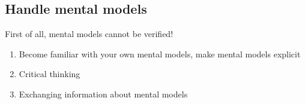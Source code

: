 \hypertarget{handle-mental-models}{%
\subsection{Handle mental models}\label{handle-mental-models}}

First of all, mental models cannot be verified!

\begin{enumerate}
\def\labelenumi{\arabic{enumi}.}
\tightlist
\item
  Become familiar with your own mental models, make mental models
  explicit
\item
  Critical thinking
\item
  Exchanging information about mental models
\end{enumerate}
